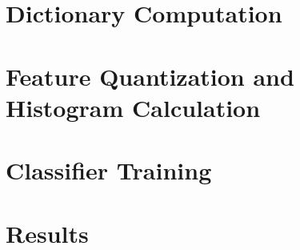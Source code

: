 
\section*{Dictionary Computation}







\section*{Feature Quantization and Histogram Calculation}
\section*{Classifier Training}
\section*{Results}

